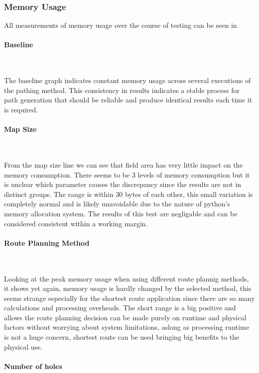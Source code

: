 \documentclass[final]{cmpreport_02}
\begin{document}
\subsubsection{Memory Usage}

All measurements of memory usage over the course of testing can be seen in 

\paragraph{Baseline} \

The baseline graph indicates constant memory usage across several executions of the pathing method.
This consistency in results indicates a stable process for path generation that should be reliable and produce identical results each time it is required.

\paragraph{Map Size} \

From the map size line we can see that field area has very little impact on the memory consumption.
There seems to be 3 levels of memory consumption but it is unclear which parameter causes the discrepancy since the results are not in distinct groups.
The range is within 30 bytes of each other, this small variation is completely normal and is likely unavoidable due to the nature of python's memory allocation system.
The results of this test are negligable and can be considered consistent within a working margin.



\paragraph{Route Planning Method} \

Looking at the peak memory usage when using different route plannig methods, it shows yet again, memory usage is hardly changed by the selected method, this seems strange especially for the shortest route application since there are so many calculations and processing overheads.
The short range is a big positive and allows the route planning decision can be made purely on runtime and physical factors without worrying about system limitations, aslong as processing runtime is not a huge concern, shortest route can be used bringing big benefits to the physical use.



\paragraph{Number of holes} \
\end{document}
